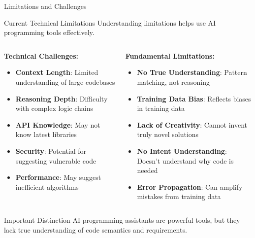 \documentclass{beamer}
\begin{document}
\begin{frame}[t]{Limitations and Challenges}
    \begin{block}{Current Technical Limitations}
        Understanding limitations helps use AI programming tools effectively.
    \end{block}
    
    \begin{columns}[t]
        \begin{column}{0.5\textwidth}
            \textbf{Technical Challenges:}
            \begin{itemize}
                \item \textbf{Context Length}: Limited understanding of large codebases
                \item \textbf{Reasoning Depth}: Difficulty with complex logic chains
                \item \textbf{API Knowledge}: May not know latest libraries
                \item \textbf{Security}: Potential for suggesting vulnerable code
                \item \textbf{Performance}: May suggest inefficient algorithms
            \end{itemize}
        \end{column}
        \begin{column}{0.5\textwidth}
            \textbf{Fundamental Limitations:}
            \begin{itemize}
                \item \textbf{No True Understanding}: Pattern matching, not reasoning
                \item \textbf{Training Data Bias}: Reflects biases in training data
                \item \textbf{Lack of Creativity}: Cannot invent truly novel solutions
                \item \textbf{No Intent Understanding}: Doesn't understand why code is needed
                \item \textbf{Error Propagation}: Can amplify mistakes from training data
            \end{itemize}
        \end{column}
    \end{columns}
    
    \vspace{0.3cm}
    \begin{alertblock}{Important Distinction}
        AI programming assistants are powerful tools, but they lack true understanding of code semantics and requirements.
    \end{alertblock}
\end{frame}
\end{document}
